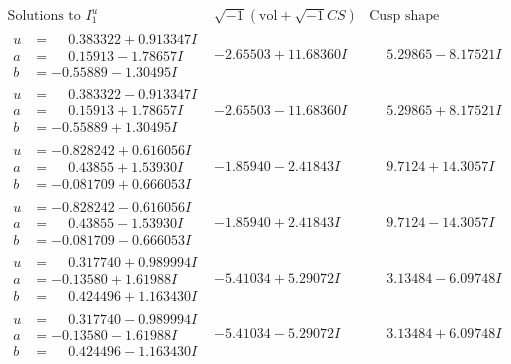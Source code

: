 \documentclass[1p]{elsarticle_modified}
\theoremstyle{definition}
\newcommand{\I}{\sqrt{-1}}
\begin{document}
$$\begin{array}{c|c|c}  
\text{Solutions to }I^u_{1}& \I (\text{vol} + \sqrt{-1}CS) & \text{Cusp shape}\\
 \hline 
\begin{aligned}
u &= \phantom{-}0.383322 + 0.913347 I \\
a &= \phantom{-}0.15913 - 1.78657 I \\
b &= -0.55889 - 1.30495 I\end{aligned}
 & -2.65503 + 11.68360 I & \phantom{-}5.29865 - 8.17521 I \\ \hline\begin{aligned}
u &= \phantom{-}0.383322 - 0.913347 I \\
a &= \phantom{-}0.15913 + 1.78657 I \\
b &= -0.55889 + 1.30495 I\end{aligned}
 & -2.65503 - 11.68360 I & \phantom{-}5.29865 + 8.17521 I \\ \hline\begin{aligned}
u &= -0.828242 + 0.616056 I \\
a &= \phantom{-}0.43855 + 1.53930 I \\
b &= -0.081709 + 0.666053 I\end{aligned}
 & -1.85940 - 2.41843 I & \phantom{-}9.7124 + 14.3057 I \\ \hline\begin{aligned}
u &= -0.828242 - 0.616056 I \\
a &= \phantom{-}0.43855 - 1.53930 I \\
b &= -0.081709 - 0.666053 I\end{aligned}
 & -1.85940 + 2.41843 I & \phantom{-}9.7124 - 14.3057 I \\ \hline\begin{aligned}
u &= \phantom{-}0.317740 + 0.989994 I \\
a &= -0.13580 + 1.61988 I \\
b &= \phantom{-}0.424496 + 1.163430 I\end{aligned}
 & -5.41034 + 5.29072 I & \phantom{-}3.13484 - 6.09748 I \\ \hline\begin{aligned}
u &= \phantom{-}0.317740 - 0.989994 I \\
a &= -0.13580 - 1.61988 I \\
b &= \phantom{-}0.424496 - 1.163430 I\end{aligned}
 & -5.41034 - 5.29072 I & \phantom{-}3.13484 + 6.09748 I \\ \hline\begin{aligned}

\end{aligned}
\end{array}$$
\end{document}

